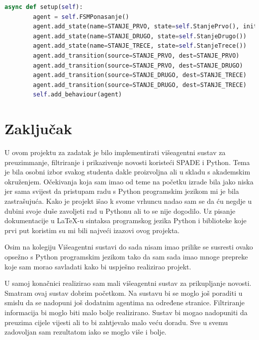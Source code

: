 \documentclass[]{foi} %
\begin{document}
\begin{lstlisting}[language=Python, caption={Programski kôd za SearchAgent agenta}]
    async def setup(self):
        agent = self.FSMPonasanje()
        agent.add_state(name=STANJE_PRVO, state=self.StanjePrvo(), initial=True)
        agent.add_state(name=STANJE_DRUGO, state=self.StanjeDrugo())
        agent.add_state(name=STANJE_TRECE, state=self.StanjeTrece())
        agent.add_transition(source=STANJE_PRVO, dest=STANJE_PRVO)
        agent.add_transition(source=STANJE_PRVO, dest=STANJE_DRUGO)
        agent.add_transition(source=STANJE_DRUGO, dest=STANJE_TRECE)
        agent.add_transition(source=STANJE_DRUGO, dest=STANJE_TRECE)
        self.add_behaviour(agent)
\end{lstlisting}

\chapter{Zaključak}

U ovom projektu za zadatak je bilo implementirati višeagentni sustav za preuzimmanje, filtriranje i prikazivenje novosti koristeći SPADE i  Python. Tema je bila osobni izbor svakog studenta dakle proizvoljna ali u skladu s akademskim okruženjem. Očekivanja koja sam imao od teme  na početku izrade bila jako niska jer sama svijest da pristupam radu s Python programskim jezikom mi je bila zastrašujuća. Kako je projekt išao k svome vrhuncu nadao sam se da ću negdje u dubini svoje duše zavoljeti rad u Pythonu ali to se nije dogodilo. Uz pisanje dokumentacije u \LaTeX -u sintaksa programskog jezika Python i biblioteke koje prvi put koristim su mi bili najveći izazovi ovog projekta.

Osim na kolegiju Višeagentni sustavi do sada nisam imao prilike se susresti ovako opsežno s Python programskim jezikom tako da sam sada imao mnoge prepreke koje sam morao savladati kako bi uspješno realizirao projekt.

U samoj konačnici realizirao sam mali višeagentni sustav za prikupljanje novosti. Smatram ovaj sustav dobrim početkom. Na sustavu bi se moglo još poraditi u smislu da se nadopuni još dodatnim agentima na određene stranice. Filtriranje informacija bi moglo biti malo bolje realizirano. Sustav bi mogao nadopuniti da preuzima cijele vijesti ali to bi zahtjevalo malo veću doradu. Sve u svemu zadovoljan sam rezultatom iako se moglo više i bolje.

\makebackmatter



\end{document}
